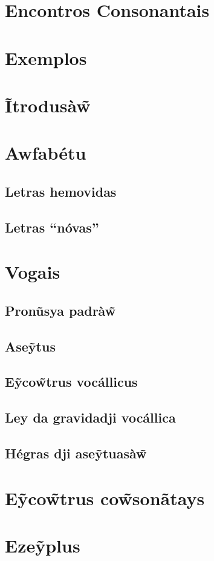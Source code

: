 \documentclass[12pt, a4paper]{article}
\begin{document}
\begin{bilingualpages}
    \section{Encontros Consonantais}
    
    \section{Exemplos}
    
    \leftpage
    \section{Ĩtrodusà\~{w}}
    
    \newpage
    \section{Awfabétu}
    \BrTableAbc

    \subsection{Letras hemovidas}
    \subsection{Letras ``nóvas''}
    
    \section{Vogais}
    \subsection{Pronũsya padrà\~w}
    \subsection{Ase\~ytus}
    \subsection{E\~yco\~wtrus vocállicus}
    \subsection{Ley da gravidadji vocállica}
    \subsection{Hégras dji ase\~ytuasà\~w}

    \section{E\~yco\~wtrus co\~wsonãtays}

    \section{Eze\~yplus}
    
\end{bilingualpages}
\end{document}
